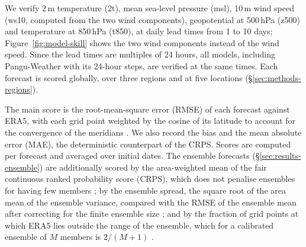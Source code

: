 We verify 2\,m temperature (2t), mean sea-level pressure (msl),
10\,m wind speed (ws10, computed from the two wind components),
geopotential at 500\,hPa (z500) and temperature at 850\,hPa (t850), at
daily lead times from 1 to 10 days; Figure~\ref{fig:model-skill} shows
the two wind components instead of the wind speed. Since the lead times
are multiples of 24 hours, all models, including Pangu-Weather with its
24-hour steps, are verified at the same times. Each forecast is scored
globally, over three regions and at five locations
(\S\ref{sec:methods-regions}).

The main score is the root-mean-square error (RMSE) of each forecast
against ERA5, with each grid point weighted by the cosine of its
latitude to account for the convergence of the meridians
\citep{rasp2020weatherbench}. We also record the bias and the mean
absolute error (MAE), the deterministic counterpart of the CRPS. Scores
are computed per forecast and averaged over initial dates. The ensemble
forecasts (\S\ref{sec:results-ensemble}) are additionally scored by the
area-weighted mean of the fair continuous ranked probability score
(CRPS), which does not penalise ensembles for having few members
\citep{ferro2014fair}; by the ensemble spread, the square root of the
area mean of the ensemble variance, compared with the RMSE of the
ensemble mean after correcting for the finite ensemble size
\citep{leutbecher2008ensemble}; and by the fraction of grid points at
which ERA5 lies outside the range of the ensemble, which for a
calibrated ensemble of $M$ members is $2/(M+1)$ \citep{siegert2011outliers}.

